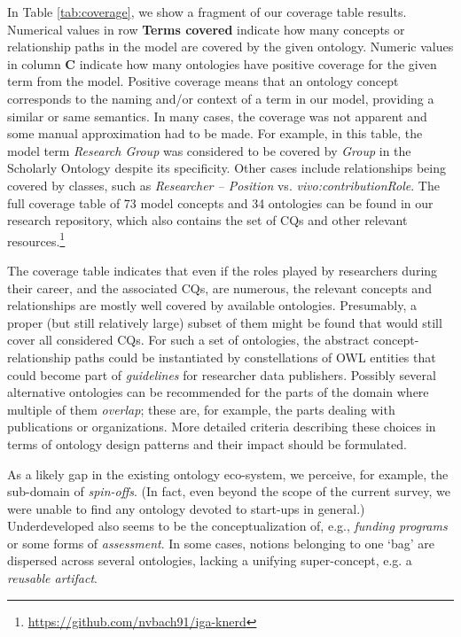 In Table \ref{tab:coverage}, we show a fragment of our coverage table results. Numerical values in row \textbf{Terms covered} indicate how many concepts or relationship paths in the model are covered by the given ontology. Numeric values in column \textbf{C} indicate how many ontologies have 
positive coverage for the given term from the model. Positive coverage means that an ontology concept corresponds to the naming and/or context of a term in our model, providing a similar or same semantics. In many cases, the coverage was not apparent and some manual approximation had to be made. For example, in this table, the model term \emph{Research Group} was considered to be covered by \emph{Group} in the Scholarly Ontology despite its specificity. Other cases include relationships being covered by classes, such as \emph{Researcher -- Position} vs. \emph{vivo:contributionRole}. The full coverage table of 73 model concepts and 34 ontologies can be found in our research repository, which also contains the set of CQs and other relevant resources.\footnote{\url{https://github.com/nvbach91/iga-knerd}}



The coverage table indicates that even if the roles played by researchers during their career, and the associated CQs, are numerous, the relevant concepts and relationships are mostly well covered by available ontologies.
Presumably, a proper (but still relatively large) subset of them might be found that would still cover all considered CQs.
For such a set of ontologies, the abstract concept-relationship paths could be instantiated by constellations of OWL entities that could become part of \emph{guidelines} for researcher data publishers. 
Possibly several alternative ontologies can be recommended for the parts of the domain where multiple of them \emph{overlap}; these are, for example, the parts dealing with publications or organizations.
More detailed criteria describing these choices in terms of ontology design patterns and their impact should be formulated.

As a likely gap in the existing ontology eco-system, we perceive, for example, the sub-domain of \emph{spin-offs}.
(In fact, even beyond the scope of the current survey, we were unable to find any ontology devoted to start-ups in general.)
Underdeveloped also seems to be the conceptualization of, e.g., \emph{funding programs} or some forms of \emph{assessment}.
In some cases, notions belonging to one `bag' are dispersed across several ontologies, lacking a unifying super-concept, e.g. a \emph{reusable artifact}.

